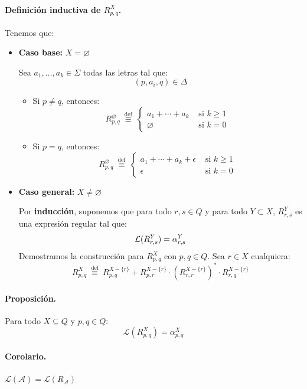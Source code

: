 \paragraph{Definición inductiva de $R_{p,q}^X$.} Tenemos que:
\begin{itemize}
    \item \textbf{Caso base:} $X = \varnothing$

          Sea $a_1,\ldots,a_k \in \Sigma$ todas las letras tal que:
          $$
              (p, a_i, q) \in \Delta
          $$
          \begin{itemize}
              \item Si $p \neq q$, entonces:
                    $$
                        R_{p, q}^{\varnothing} \stackrel{\text { def }}{\equiv} \begin{cases}a_1+\cdots+a_k & \text { si } k \geq 1 \\ \varnothing & \text { si } k=0\end{cases}
                    $$
              \item Si $p = q$, entonces:
                    $$
                        R_{p, q}^{\varnothing} \stackrel{\text { def }}{\equiv} \begin{cases}a_1+\cdots+a_k+\epsilon & \text { si } k \geq 1 \\ \epsilon & \text { si } k=0\end{cases}
                    $$
          \end{itemize}

    \item \textbf{Caso general:} $X \neq \varnothing$

          Por \textbf{inducción}, suponemos que para todo $r,s \in Q$ y para todo $Y \subset X$, $R_{r,s}^Y$ es una expresión regular tal que:
          $$
              \mathcal{L}(R_{r,s}^Y) = \alpha_{r,s}^Y
          $$
          Demostramos la construcción para $R_{p,q}^X$ con $p,q \in Q$. Sea $r \in X$ cualquiera:
          $$
              R_{p, q}^X \stackrel{\text { def }}{\equiv} R_{p, q}^{X-\{r\}}+R_{p, r}^{X-\{r\}} \cdot\left(R_{r, r}^{X-\{r\}}\right)^* \cdot R_{r, q}^{X-\{r\}}
          $$
\end{itemize}
\paragraph{Proposición.} Para todo $X \subseteq Q$ y $p,q \in Q$:
$$
    \mathcal{L}\left(R_{p, q}^X\right)=\alpha_{p, q}^X
$$
\paragraph{Corolario.} $\mathcal{L}(\mathcal{A})=\mathcal{L}\left(R_{\mathcal{A}}\right)$

